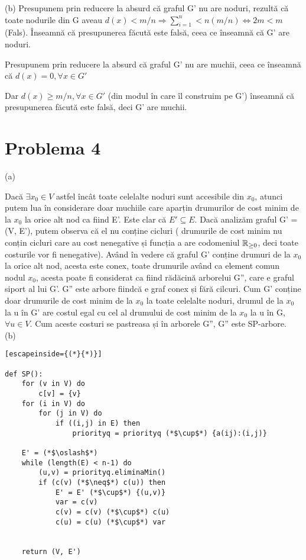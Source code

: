\documentclass{article}
\begin{document}
(b)
Presupunem prin reducere la absurd că graful G' nu are noduri, rezultă că toate nodurile din G aveau $d(x) < m/n \Rightarrow \sum_{i=1}^{n} < n(m/n) \iff 2m < m $  (Fals). Înseamnă că presupunerea făcută este falsă, ceea ce înseamnă că G' are noduri.

Presupunem prin reducere la absurd că graful G' nu are muchii, ceea ce înseamnă că $d(x) = 0, \forall x \in G'$

Dar $ d(x) \geq m/n, \forall x \in G' $ (din modul în care îl construim pe G') înseamnă că presupunerea făcută este falsă, deci G' are muchii.





\section*{Problema 4}

(a)

Dacă $\exists x_0 \in V $ astfel încât toate celelalte noduri sunt accesibile din $x_0$, atunci putem lua în considerare doar muchiile care aparțin drumurilor de cost minim de la  $x_0$ la orice alt nod ca fiind E'. Este clar că  $E' \subseteq E$. Dacă analizăm graful G' = (V, E'), putem observa că el nu conține cicluri ( drumurile de cost minim nu conțin cicluri care au cost nenegative și funcția a are codomeniul $ \Bbb R_{\ge 0} $, deci toate costurile vor fi nenegative). Având în vedere că graful G' conține drumuri de la $x_0$ la orice alt nod, acesta este conex, toate drumurile având ca element comun nodul $x_0$, acesta poate fi considerat ca fiind rădăcină arborelui G'', care e graful siport al lui G'. G'' este arbore fiindcă e graf conex și fără cilcuri. Cum G' conține doar drumurile de cost minim de la   $x_0$ la toate celelalte noduri, drumul de la   $x_0$ la u în G' are costul egal cu cel al drumului de cost minim de la   $x_0$ la u în G, $ \forall u \in V$. Cum aceste costuri se pastreasa și în arborele G'', G'' este SP-arbore. \\


(b)
\begin{lstlisting}[escapeinside={(*}{*)}]
 
def SP():
	for (v in V) do
		c[v] = {v}
	for (i in V) do
		for (j in V) do
			if ((i,j) in E) then
				priorityq = priorityq (*$\cup$*) {a(ij):(i,j)}
	
	E' = (*$\oslash$*)
	while (length(E) < n-1) do
		(u,v) = priorityq.eliminaMin()
		if (c(v) (*$\neq$*) c(u)) then 
			E' = E' (*$\cup$*) {(u,v)}
			var = c(v)
			c(v) = c(v) (*$\cup$*) c(u)
			c(u) = c(u) (*$\cup$*) var


	return (V, E')

\end{lstlisting}
\end{document}
